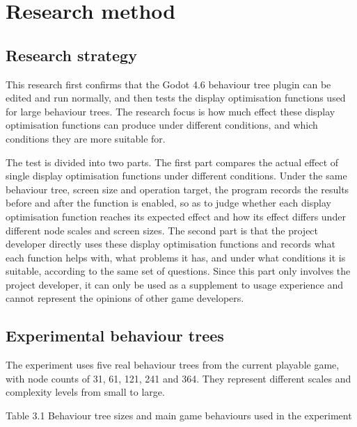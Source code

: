 \documentclass[11pt,a4paper,oneside,extrafontsizes]{memoir}
\begin{document}
\chapter{Research method}

\section{Research strategy}

This research first confirms that the Godot 4.6 behaviour tree plugin can be edited and run normally, and then tests the display optimisation functions used for large behaviour trees. The research focus is how much effect these display optimisation functions can produce under different conditions, and which conditions they are more suitable for.

The test is divided into two parts. The first part compares the actual effect of single display optimisation functions under different conditions. Under the same behaviour tree, screen size and operation target, the program records the results before and after the function is enabled, so as to judge whether each display optimisation function reaches its expected effect and how its effect differs under different node scales and screen sizes. The second part is that the project developer directly uses these display optimisation functions and records what each function helps with, what problems it has, and under what conditions it is suitable, according to the same set of questions. Since this part only involves the project developer, it can only be used as a supplement to usage experience and cannot represent the opinions of other game developers.

\section{Experimental behaviour trees}

The experiment uses five real behaviour trees from the current playable game, with node counts of 31, 61, 121, 241 and 364. They represent different scales and complexity levels from small to large.

Table 3.1 Behaviour tree sizes and main game behaviours used in the experiment
\end{document}
